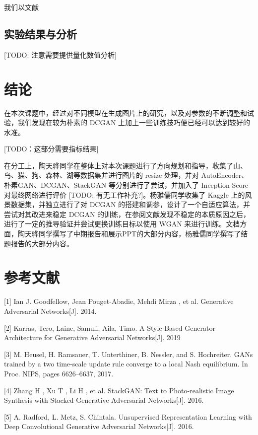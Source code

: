 \documentclass{article}
\begin{document}
\begin{CJK*}{UTF8}{gbsn}
	我们以文献        

  \subsection{实验结果与分析}

	
  [TODO: 注意需要提供量化数值分析]

\section{结论}

在本次课题中，经过对不同模型在生成图片上的研究，以及对参数的不断调整和试验，我们发现在较为朴素的 DCGAN 上加上一些训练技巧便已经可以达到较好的水准。

[TODO：这部分需要指标结果]

  在分工上，陶天骅同学在整体上对本次课题进行了方向规划和指导，收集了山、鸟、猫、狗、森林、湖等数据集并进行图片的 resize 处理，并对 AutoEncoder、朴素GAN、DCGAN、StackGAN 等分别进行了尝试，并加入了 Inception Score 对最终网络进行评价 [TODO: 有无工作补充?]。杨雅儒同学收集了 Kaggle 上的风景数据集，并独立进行了对 DCGAN 的搭建和调参，设计了一个自适应算法，并尝试对其改进来稳定 DCGAN 的训练，在参阅文献发现不稳定的本质原因之后，进行了一定的推导验证并尝试更换训练目标以使用 WGAN 来进行训练。文档方面，陶天骅同学撰写了中期报告和展示PPT的大部分内容，杨雅儒同学撰写了结题报告的大部分内容。

\section*{参考文献}

\small

[1] Ian J. Goodfellow, Jean Pouget-Abadie, Mehdi Mirza , et al. Generative Adversarial Networks[J]. 2014.

[2] Karras, Tero, Laine, Samuli, Aila, Timo. A Style-Based Generator Architecture for Generative Adversarial Networks[J]. 2019

[3] M. Heusel, H. Ramsauer, T. Unterthiner, B. Nessler, and S. Hochreiter. GANs trained by a two time-scale update rule converge to a local Nash equilibrium. In Proc. NIPS, pages 6626–6637, 2017.

[4] Zhang H , Xu T , Li H , et al. StackGAN: Text to Photo-realistic Image Synthesis with Stacked Generative Adversarial Networks[J]. 2016.

[5] A. Radford, L. Metz, S. Chintala. Unsupervised Representation Learning with Deep Convolutional Generative Adversarial Networks[J]. 2016.


\end{CJK*}
\end{document}

